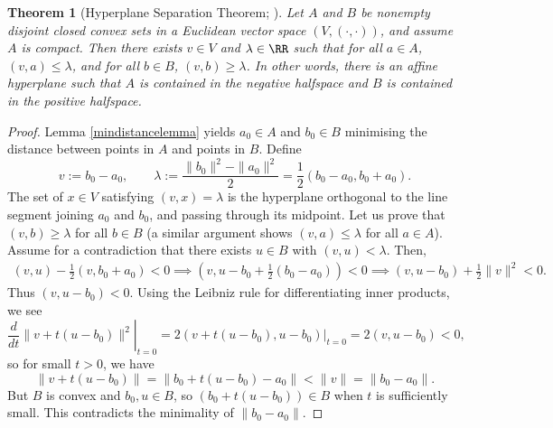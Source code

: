 \documentclass[12pt]{amsart}
\theoremstyle{plain}
\newtheorem{theorem}{Theorem}%
\begin{document}
\begin{theorem}[Hyperplane Separation Theorem; {\cite[\S 2.5.1]{BV04}}]\label{hyperplaneseparation}
Let $A$ and $B$ be nonempty disjoint closed convex sets in a Euclidean vector space $(V, (\cdot,\cdot))$, and assume $A$ is compact.
Then there exists $v \in V$ and $\lambda \in \RR$ such that for all $a \in A$, $(v, a) \le \lambda$, and for all $b \in B$, $(v, b) \ge \lambda$.
In other words, there is an affine hyperplane such that $A$ is contained in the negative halfspace and $B$ is contained in the positive halfspace.
\end{theorem}

\begin{proof}
Lemma \ref{mindistancelemma} yields $a_0 \in A$ and $b_0 \in B$ minimising the distance between points in $A$ and points in $B$.
Define
$$v := b_0 - a_0, \qquad \lambda := \frac{\|b_0\|^2 - \|a_0\|^2}{2} = \frac{1}{2}(b_0 - a_0, b_0 + a_0).$$
The set of $x \in V$ satisfying $(v, x) = \lambda$ is the hyperplane orthogonal to the line segment joining $a_0$ and $b_0$, and passing through its midpoint.
Let us prove that $(v, b) \ge \lambda$ for all $b \in B$ (a similar argument shows $(v, a) \le \lambda$ for all $a \in A$).
Assume for a contradiction that there exists $u \in B$ with $(v, u) < \lambda$.
Then,
\begin{align*}
	(v, u) - \frac{1}{2}(v, b_0 + a_0) < 0
							 \implies (v, u - b_0 + \frac{1}{2} (b_0 - a_0)) < 0
							 \implies (v, u - b_0) + \frac{1}{2} \|v\|^2 < 0.
\end{align*}
Thus $(v, u - b_0) < 0$.
Using the Leibniz rule for differentiating inner products, we see
$$\left. \frac{d}{dt} \|v + t(u - b_0)\|^2 \right|_{t=0} = \left. 2 (v + t(u-b_0), u - b_0) \right|_{t=0} = 2 (v, u - b_0) < 0,$$
so for small $t > 0$, we have
$$\|v + t(u - b_0)\| = \|b_0 + t(u - b_0) - a_0\| < \|v\| = \|b_0 - a_0\|.$$
But $B$ is convex and $b_0, u \in B$, so $(b_0 + t (u - b_0)) \in B$ when $t$ is sufficiently small.
This contradicts the minimality of $\|b_0 - a_0\|$.
\end{proof}
\end{document}
